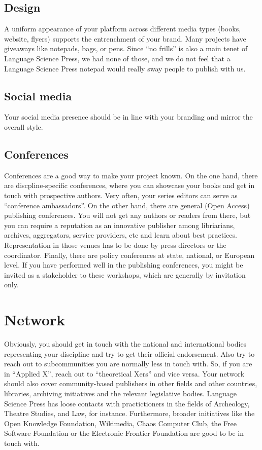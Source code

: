 \documentclass[nonflat,modfonts,output=book] {langsci/langscibook}
\begin{document}
\subsection{Design}
A uniform appearance of your platform across different media types (books, website, flyers) supports the entrenchment of your brand. Many projects have giveaways like notepads, bags, or pens. Since  ``no frills'' is also a main tenet of Language Science Press, we had none of those, and we do not feel that a Language Science Press notepad would really sway people to publish with us. 

\subsection{Social media}
Your social media presence should be in line with your branding and mirror the overall style. 


\subsection{Conferences}
Conferences are a good way to make your project known. On the one hand, there are discpline-specific conferences, where you can showcase your books and get in touch with prospective authors. Very often, your series editors can serve as ``conference ambassadors''. On the other hand, there are general (Open Access) publishing conferences. You will not get any authors or readers from there, but you can require a reputation as an innovative publisher among libriarians, archives, aggregators, service providers, etc and learn about best practices. Representation in those venues has to be done by press directors or the coordinator. Finally, there are policy conferences at state, national, or  European level. If you have performed well in the publishing conferences, you might be invited as a stakeholder to these workshops, which are generally by invitation only. 

\section{Network}\label{sec:network}
Obviously, you should get in touch with the national and international bodies representing your discipline and try to get their official endorsement. Also try to reach out to subcommunities you are normally less in touch with. So, if you are in ``Applied X'', reach out to ``theoretical Xers'' and vice versa. Your network should also cover community-based publishers in other fields and other countries, libraries, archiving initiatives and the relevant legislative bodies. Language Science Press has loose contacts with practictioners in the fields of Archeology, Theatre Studies, and Law, for instance. 
Furthermore, broader initiatives like the Open Knowledge Foundation, Wikimedia, Chaos Computer Club, the Free Software Foundation or the Electronic Frontier Foundation are good to be in touch with.
\end{document}
